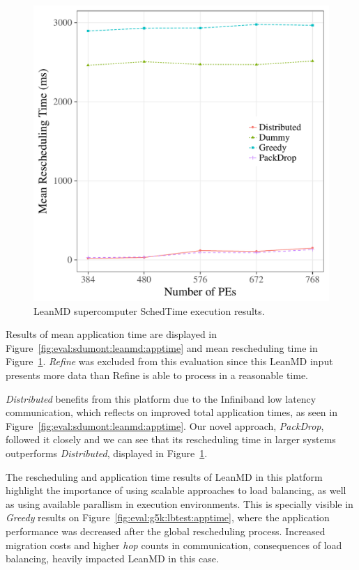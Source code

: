 \begin{figure}
	\centering
	\includegraphics[width=0.9\linewidth]{images/schedtime_leanmd_sdumont.pdf}
	\caption{LeanMD supercomputer SchedTime execution results.}
	\label{fig:eval:sdumont:leanmd:schedtime}
\end{figure}

Results of mean application time are displayed in Figure~\ref{fig:eval:sdumont:leanmd:apptime} and mean rescheduling time in Figure~\ref{fig:eval:sdumont:leanmd:schedtime}.
\textit{Refine} was excluded from this evaluation since this LeanMD input presents more data than Refine is able to process in a reasonable time.

\textit{Distributed} benefits from this platform due to the Infiniband low latency communication, which reflects on improved total application times, as seen in Figure~\ref{fig:eval:sdumont:leanmd:apptime}.
Our novel approach, \textit{PackDrop}, followed it closely and we can see that its rescheduling time in larger systems outperforms \textit{Distributed}, displayed in Figure~\ref{fig:eval:sdumont:leanmd:schedtime}.

The rescheduling and application time results of LeanMD in this platform highlight the importance of using scalable approaches to load balancing, as well as using available parallism in execution environments.
This is specially visible in \textit{Greedy} results on Figure~\ref{fig:eval:g5k:lbtest:apptime}, where the application performance was decreased after the global rescheduling process.
Increased migration costs and higher \textit{hop} counts in communication, consequences of load balancing, heavily impacted LeanMD in this case.

